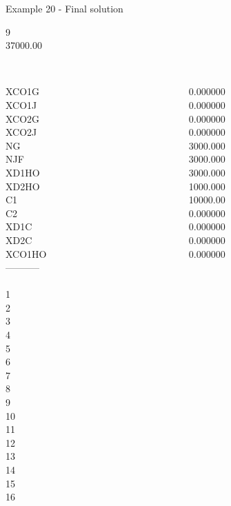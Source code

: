 \begin{frame}{Example 20 - Final solution}

  9\\
  37000.00\\

\begin{columns}[t]
\begin{column}{0.3\textwidth}
\\
XCO1G\\
XCO1J\\
XCO2G\\
XCO2J\\
NG\\
NJF\\
XD1HO\\
XD2HO\\
C1\\
C2\\
XD1C\\
XD2C\\
XCO1HO\\
-----------\\
\\
1\\
2\\
3\\
4\\
5\\
6\\
7\\
8\\
9\\
10\\
11\\
12\\
13\\
14\\
15\\
16\\

\end{column}

\begin{column}{0.3\textwidth}
\\
0.000000\\
0.000000\\
0.000000\\
0.000000\\
3000.000\\
3000.000\\
3000.000\\
1000.000\\
10000.00\\
0.000000\\
0.000000\\
0.000000\\
0.000000\\


\end{column}
\end{columns}
\end{frame}
